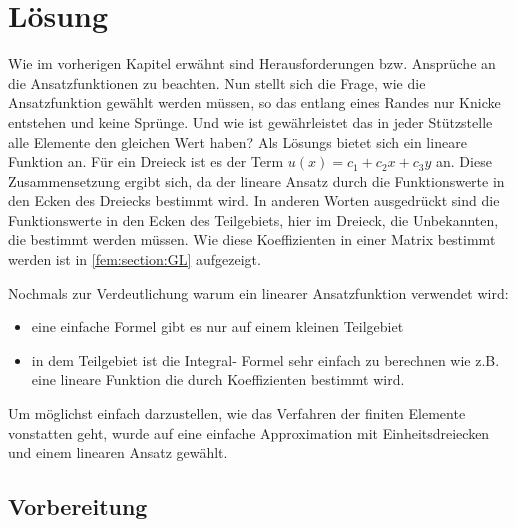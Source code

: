 %
%
%
\section{Lösung
\label{fem:section:loesung}}
Wie im vorherigen Kapitel erwähnt sind Herausforderungen bzw. Ansprüche an die Ansatzfunktionen zu beachten. Nun stellt sich die Frage, wie die Ansatzfunktion gewählt werden müssen, so das entlang eines Randes nur \frqq Knicke \flqq entstehen und keine Sprünge. Und wie ist gewährleistet das in jeder Stützstelle alle Elemente den gleichen Wert haben?  Als Lösungs bietet sich ein lineare Funktion an. Für ein Dreieck  ist es der Term $u(x) = c_1 + c_2x + c_3y$ an. Diese Zusammensetzung ergibt sich, da der lineare Ansatz durch die Funktionswerte in den Ecken des Dreiecks bestimmt wird. In anderen Worten ausgedrückt sind die Funktionswerte in den Ecken des Teilgebiets, hier im Dreieck, die Unbekannten, die bestimmt werden müssen. Wie diese Koeffizienten in einer Matrix bestimmt werden ist in \ref{fem:section:GL} aufgezeigt.

Nochmals zur Verdeutlichung warum ein linearer Ansatzfunktion verwendet wird:
\begin{itemize}
	\item eine einfache Formel gibt es nur auf einem kleinen Teilgebiet
	\item in dem Teilgebiet ist die Integral- Formel sehr einfach zu berechnen wie z.B. eine lineare Funktion die durch Koeffizienten bestimmt wird.
\end{itemize}
Um möglichst einfach darzustellen, wie das Verfahren der finiten Elemente vonstatten geht, wurde auf eine einfache Approximation mit Einheitsdreiecken und einem linearen Ansatz gewählt. 

\subsection{Vorbereitung
\label{fem:section:loesungTrans}}

